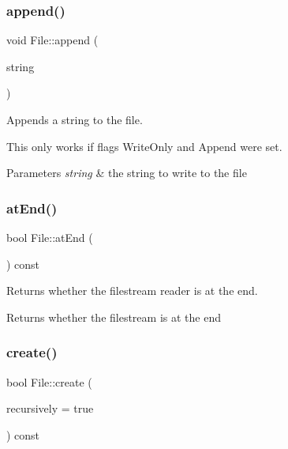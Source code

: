 \subsubsection{\texorpdfstring{append()}{append()}}
{\footnotesize\ttfamily void File\+::append (\begin{DoxyParamCaption}\item[{const \mbox{\hyperlink{class_a_string}{A\+String}} \&}]{string }\end{DoxyParamCaption})}



Appends a string to the file. 

This only works if flags Write\+Only and Append were set.


\begin{DoxyParams}{Parameters}
{\em string} & the string to write to the file \\
\hline
\end{DoxyParams}
\mbox{\label{class_file_a6f433c3bbc327cf15217d2f3c4cd043d}} 
\subsubsection{\texorpdfstring{atEnd()}{atEnd()}}
{\footnotesize\ttfamily bool File\+::at\+End (\begin{DoxyParamCaption}{ }\end{DoxyParamCaption}) const}



Returns whether the filestream reader is at the end. 

\begin{DoxyReturn}{Returns}
whether the filestream is at the end 
\end{DoxyReturn}
\mbox{\label{class_file_a208b0649e571a157d00dd91c6927d4be}} 
\subsubsection{\texorpdfstring{create()}{create()}\hspace{0.1cm}{\footnotesize\ttfamily [1/2]}}
{\footnotesize\ttfamily bool File\+::create (\begin{DoxyParamCaption}\item[{bool}]{recursively = {\ttfamily true} }\end{DoxyParamCaption}) const}




